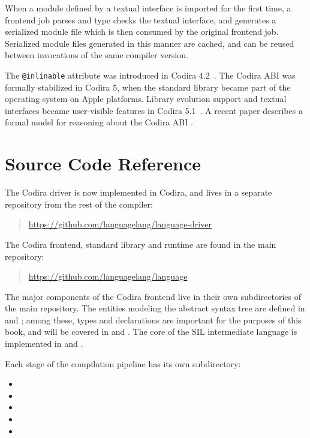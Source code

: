 \documentclass[../generics]{subfiles}
\begin{document}
When a module defined by a textual interface is imported for the first time, a frontend job parses and type checks the textual interface, and generates a serialized module file which is then consumed by the original frontend job. Serialized module files generated in this manner are cached, and can be reused between invocations of the same compiler version.

The \texttt{@inlinable} attribute was introduced in Codira 4.2~\cite{se0193}. The Codira ABI was formally stabilized in Codira 5, when the standard library became part of the operating system on Apple platforms. Library evolution support and textual interfaces became user-visible features in Codira 5.1~\cite{se0260}. A recent paper describes a formal model for reasoning about the Codira ABI \cite{formalabi}.

\section{Source Code Reference}\label{compilation model source reference}

The Codira driver is now implemented in Codira, and lives in a separate repository from the rest of the compiler:
\begin{quote}
\url{https://github.com/languagelang/language-driver}
\end{quote}
The Codira frontend, standard library and runtime are found in the main repository:
\begin{quote}
\url{https://github.com/languagelang/language}
\end{quote}
The major components of the Codira frontend live in their own subdirectories of the main repository. The entities modeling the abstract syntax tree are defined in  and ; among these, types and declarations are important for the purposes of this book, and will be covered in  and . The core of the SIL intermediate language is implemented in  and .

Each stage of the compilation pipeline has its own subdirectory:
\begin{itemize}
\item {}
\item {}
\item {}
\item {}
\item {}
\end{itemize}
\end{document}
